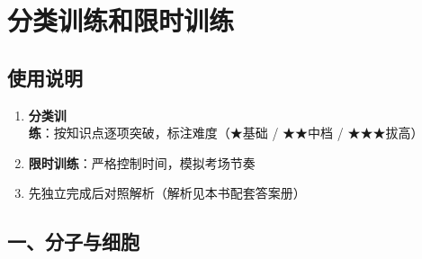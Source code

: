 \section{分类训练和限时训练}

\subsection{使用说明}
\begin{enumerate}
  \item \textbf{分类训练}：按知识点逐项突破，标注难度（★基础 / ★★中档 / ★★★拔高）
  \item \textbf{限时训练}：严格控制时间，模拟考场节奏
  \item 先独立完成后对照解析（解析见本书配套答案册）
\end{enumerate}

\subsection{一、分子与细胞}

